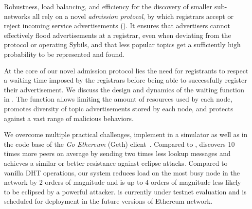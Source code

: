Robustness, load balancing, and efficiency for the discovery of smaller sub-networks all rely on a novel \emph{admission protocol}, by which registrars accept or reject incoming service advertisements ().
It ensures that advertisers cannot effectively flood advertisements at a registrar, even when deviating from the protocol or operating Sybils, and that less popular topics get a sufficiently high probability to be represented and found.

At the core of our novel admission protocol lies the need for registrants to respect a waiting time imposed by the registrars before being able to successfully register their advertisement.
We discuss the design and dynamics of the waiting function in .
The function allows limiting the amount of resources used by each node, promotes diversity of topic advertisements stored by each node, and protects against a vast range of malicious behaviors.


We overcome multiple practical challenges, implement \sysname in a simulator as well as in the code base of the \emph{Go Ethereum} (Geth) client~\cite{geth}.
Compared to \discv, \sysname discovers 10 times more peers on average by sending two times less lookup messages and achieves a similar or better resistance against eclipse attacks. 
Compared to vanilla DHT operations, our system reduces load on the most busy node in the network by 2 orders of magnitude and is up to 4 orders of magnitude less likely to be eclipsed by a powerful attacker.   
\sysname is currently under testnet evaluation and is scheduled for deployment in the future versions of Ethereum network. 
